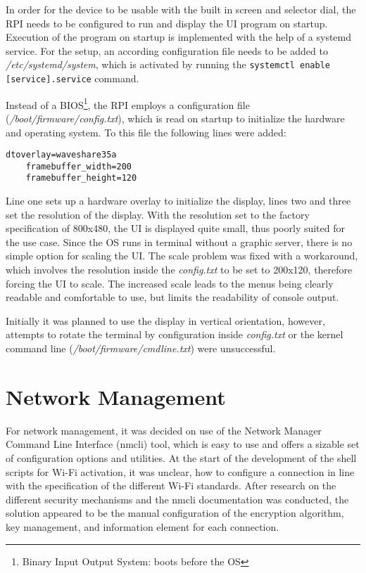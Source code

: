 In order for the device to be usable with the built in screen and selector dial, the RPI needs to be configured to run and display the UI program on startup.
Execution of the program on startup is implemented with the help of a systemd service.
For the setup, an according configuration file needs to be added to \textit{/etc/systemd/system}, which is activated by running the \lstinline[]|systemctl enable [service].service| command.

Instead of a BIOS\footnote{Binary Input Output System: boots before the OS}, the RPI employs a configuration file (\textit{/boot/firmware/config.txt}), which is read on startup to initialize the hardware and operating system.
To this file the following lines were added:

\begin{lstlisting}[numbers=none, frame=none]
    dtoverlay=waveshare35a
    framebuffer_width=200
    framebuffer_height=120 
\end{lstlisting}

Line one sets up a hardware overlay to initialize the display, lines two and three set the resolution of the display.
With the resolution set to the factory specification of 800x480, the UI is displayed quite small, thus poorly suited for the use case.
Since the OS runs in terminal without a graphic server, there is no simple option for scaling the UI.
The scale problem was fixed with a workaround, which involves the resolution inside the \textit{config.txt} to be set to 200x120, therefore forcing the UI to scale.
The increased scale leads to the menus being clearly readable and comfortable to use, but limits the readability of console output.

Initially it was planned to use the display in vertical orientation, however, attempts to rotate the terminal by configuration inside \textit{config.txt} or the kernel command line (\textit{/boot/firmware/cmdline.txt}) were unsuccessful.

\section{Network Management}\label{sec:network_management}
For network management, it was decided on use of the Network Manager Command Line Interface (nmcli) tool, which is easy to use and offers a sizable set of configuration options and utilities.
At the start of the development of the shell scripts for Wi-Fi activation, it was unclear, how to configure a connection in line with the specification of the different Wi-Fi standards.
After research on the different security mechanisms and the nmcli documentation was conducted, the solution appeared to be the manual configuration of the encryption algorithm, key management, and information element for each connection.

